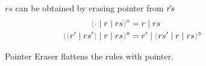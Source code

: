 
\begin{figure}[ht]

        {$rs$ can be obtained by erasing pointer from $\hat{rs}$}
\begin{align*}
  \rmpointer{\zruls{\cdot}{r}{rs}} &= \hrules{r}{rs} \\
  \rmpointer{\zruls{\hrulesP{r'}{rs'}}{r}{rs}} &= \hrules{r'}{\rmpointer{\zruls{rs'}{r}{rs}}}
\end{align*}

\caption{Pointer Eraser flattens the rules with pointer.}
\label{fig:pointer-eraser}
\end{figure}
